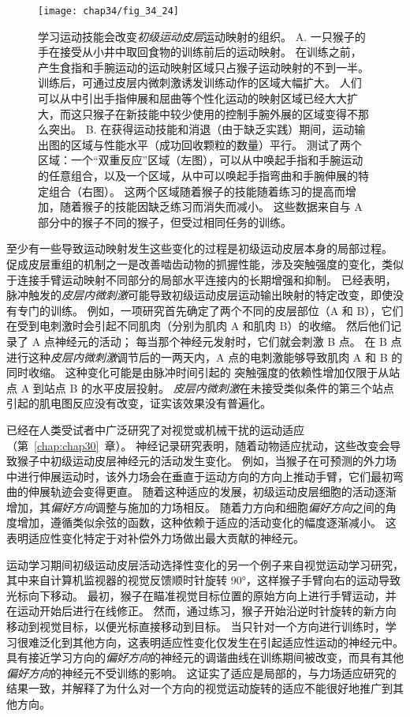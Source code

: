 \begin{figure}[htbp]
	\centering
	\texttt{[image: chap34/fig\_34\_24]}
	\caption{学习运动技能会改变\textit{初级运动皮层}运动映射的组织\cite{nudo1996use}。
		A. 一只猴子的手在接受从小井中取回食物的训练前后的运动映射。
		在训练之前，产生食指和手腕运动的运动映射区域只占猴子运动映射的不到一半。
		训练后，可通过皮层内微刺激诱发训练动作的区域大幅扩大。
		人们可以从中引出手指伸展和屈曲等个性化运动的映射区域已经大大扩大，而这只猴子在新技能中较少使用的控制手腕外展的区域变得不那么突出。
		B. 在获得运动技能和消退（由于缺乏实践）期间，运动输出图的区域与性能水平（成功回收颗粒的数量）平行。
		测试了两个区域：一个“双重反应”区域（左图），可以从中唤起手指和手腕运动的任意组合，以及一个区域，从中可以唤起手指弯曲和手腕伸展的特定组合（右图）。
		这两个区域随着猴子的技能随着练习的提高而增加，随着猴子的技能因缺乏练习而消失而减小。
		这些数据来自与 A 部分中的猴子不同的猴子，但受过相同任务的训练。}
	\label{fig:34_24}
\end{figure}


至少有一些导致运动映射发生这些变化的过程是初级运动皮层本身的局部过程。
促成皮层重组的机制之一是改善啮齿动物的抓握性能，涉及突触强度的变化，类似于连接手臂运动映射不同部分的局部水平连接内的长期增强和抑制。
已经表明，脉冲触发的\textit{皮层内微刺激}可能导致初级运动皮层运动输出映射的特定改变，即使没有专门的训练。
例如，一项研究首先确定了两个不同的皮层部位（A 和 B），它们在受到电刺激时会引起不同肌肉（分别为肌肉 A 和肌肉 B）的收缩。
然后他们记录了 A 点神经元的活动； 每当那个神经元发射时，它们就会刺激 B 点。
在 B 点进行这种\textit{皮层内微刺激}调节后的一两天内，A 点的电刺激能够导致肌肉 A 和 B 的同时收缩。
这种变化可能是由脉冲时间引起的 突触强度的依赖性增加仅限于从站点 A 到站点 B 的水平皮层投射。
\textit{皮层内微刺激}在未接受类似条件的第三个站点引起的肌电图反应没有改变，证实该效果没有普遍化。


已经在人类受试者中广泛研究了对视觉或机械干扰的运动适应（第~\ref{chap:chap30}~章）。
神经记录研究表明，随着动物适应扰动，这些改变会导致猴子中初级运动皮层神经元的活动发生变化。
例如，当猴子在可预测的外力场中进行伸展运动时，该外力场会在垂直于运动方向的方向上推动手臂，它们最初弯曲的伸展轨迹会变得更直。
随着这种适应的发展，初级运动皮层细胞的活动逐渐增加，其\textit{偏好方向}调整与施加的力场相反。
随着力方向和细胞\textit{偏好方向}之间的角度增加，遵循类似余弦的函数，这种依赖于适应的活动变化的幅度逐渐减小。
这表明适应性变化特定于对补偿外力场做出最大贡献的神经元。


运动学习期间初级运动皮层活动选择性变化的另一个例子来自视觉运动学习研究，其中来自计算机监视器的视觉反馈顺时针旋转 90°，这样猴子手臂向右的运动导致光标向下移动。
最初，猴子在瞄准视觉目标位置的原始方向上进行手臂运动，并在运动开始后进行在线修正。
然而，通过练习，猴子开始沿逆时针旋转的新方向移动到视觉目标，以便光标直接移动到目标。
当只针对一个方向进行训练时，学习很难泛化到其他方向，这表明适应性变化仅发生在引起适应性运动的神经元中。
具有接近学习方向的\textit{偏好方向}的神经元的调谐曲线在训练期间被改变，而具有其他\textit{偏好方向}的神经元不受训练的影响。
这证实了适应是局部的，与力场适应研究的结果一致，并解释了为什么对一个方向的视觉运动旋转的适应不能很好地推广到其他方向。


